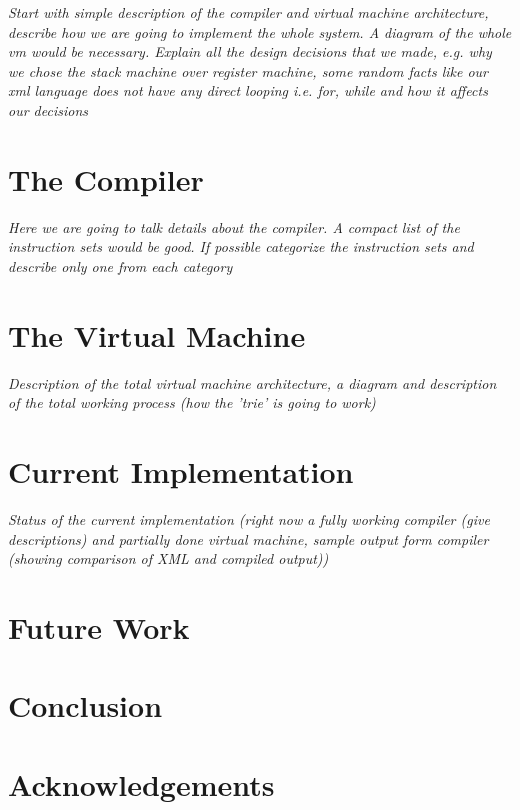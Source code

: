 \documentclass[11pt]{article}
\begin{document}
{\itshape{Start with simple description of the compiler and virtual
    machine architecture, describe how we are going to implement the
    whole system. A diagram of the whole vm would be
    necessary. Explain all the design decisions that we made, e.g. why
    we chose the stack machine over register machine, some random facts
    like our xml language does not have any direct looping i.e. for,
    while and how it affects our decisions}}

\section{The Compiler}
\label{sec:compiler}

{\itshape{Here we are going to talk details about the compiler. A
    compact list of the instruction sets would be good. If possible
    categorize the instruction sets and describe only one from each
    category}}

\section{The Virtual Machine}
\label{sec:virtual-machine}
{\itshape{Description of the total virtual machine architecture, a
    diagram and description of the total working process (how the
    'trie' is going to work)}}

\section{Current Implementation}
\label{sec:curr-impl}
{\itshape{Status of the current implementation (right now a fully
    working compiler (give descriptions) and partially done virtual
    machine, sample output form compiler (showing comparison of XML
    and compiled output))}}


\section{Future Work}
\label{sec:future-work}

\section{Conclusion}
\label{sec:conclusion}


\section*{Acknowledgements}
\label{sec:acknowledgements}
\end{document}

